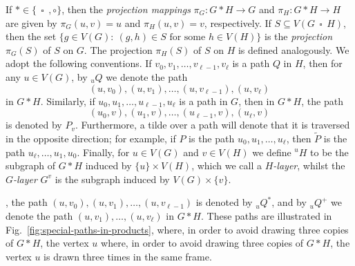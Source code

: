 \documentclass[12pt]{article}
\DeclareMathOperator{\cp}{\,\square\,}
\begin{document}
If $\ast \in \{\cp, \circ\}$, then the \emph{projection mappings} $\pi _G:G \ast H \rightarrow G$ and $\pi _H: G \ast H \rightarrow H$ are given by $\pi _G(u,v) = u$ and $\pi _H(u,v) = v$, respectively. If $S \subseteq V(G \cp H)$, then the set $\{g \in V(G) :\ (g,h) \in S \text{ for some } h \in V(H)\}$ is the \emph{projection} $\pi_G(S)$ of $S$ on $G$. The projection $\pi_H(S)$ of $S$ on $H$ is defined analogously. We adopt the following conventions. If $v_0,v_1,\dots ,v_{\ell -1},v_{\ell }$ is a path $Q$ in $H$, then for any $u\in V(G)$, by $_uQ$ we denote the path \[ (u,v_0),(u,v_1),\dots ,(u,v_{\ell -1}),(u,v_{\ell })\] 
in $G \ast H$. Similarly, if $u_0, u_1,\dots ,u_{\ell -1}, u_{\ell }$ is a path in $G$, then in $G \ast H$, the path 
$$(u_0,v),(u_1,v),\dots ,(u_{\ell -1},v),(u_{\ell },v)$$ 
is denoted by $P_v$. Furthermore, a tilde over a path will denote that it is traversed in the opposite direction; for example, if $P$ is the path $u_0,u_1,\dots ,u_{\ell }$, then $\widetilde{P}$ is the path $u_{\ell },\dots, u_1,u_0$. Finally, for $u \in V(G)$ and $v \in V(H)$ we define $^uH$ to be the subgraph of $G \ast H$ induced by $\{ u\} \times V(H)$, which we call a \emph{$H$-layer}, whilst the \emph{$G$-layer} $G^v$ is the subgraph induced by $V(G) \times \{ v\} $. 
 

\iffalse
, the path $(u,v_0),(u,v_1),\dots ,(u,v_{\ell -1})$ is denoted by $_uQ^\ast$, and by $_uQ^+$ we denote the path $(u,v_1),\dots, (u,v_{\ell})$ in $G \ast H$. These paths are illustrated in Fig.~\ref{fig:special-paths-in-products}, where, in order to avoid drawing three copies of $G\ast H$, the vertex $u$ where, in order to avoid drawing three copies of $G\ast H$, the vertex $u$ is drawn three times in the same frame. 
\end{document}
